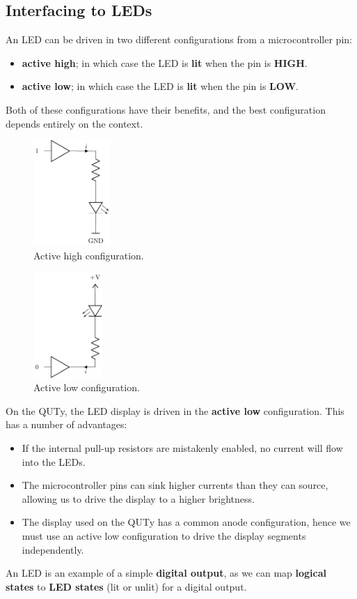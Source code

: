 \documentclass[a4paper]{report}
\begin{document}
\subsection{Interfacing to LEDs}
An LED can be driven in two different configurations from a microcontroller pin:
\begin{itemize}
    \item \textbf{active high}; in which case the LED is \textbf{lit} when the pin is \textbf{HIGH}.
    \item \textbf{active low}; in which case the LED is \textbf{lit} when the pin is \textbf{LOW}.
\end{itemize}
Both of these configurations have their benefits, and the best configuration depends entirely on the context.
\begin{multicols}{2}
    \begin{figure}[H]
        \centering
        \includegraphics[height = 4cm, keepaspectratio = true]{figures/active_high_LED.pdf}
        \caption{Active high configuration.} %
    \end{figure}
    \begin{figure}[H]
        \centering
        \includegraphics[height = 4cm, keepaspectratio = true]{figures/active_low_LED.pdf}
        \caption{Active low configuration.} %
    \end{figure}
\end{multicols}
On the QUTy, the LED display is driven in the \textbf{active low} configuration.
This has a number of advantages:
\begin{itemize}
    \item If the internal pull-up resistors are mistakenly enabled, no current will
          flow into the LEDs.
    \item The microcontroller pins can sink higher currents than they can source,
          allowing us to drive the display to a higher brightness.
    \item The display used on the QUTy has a common anode configuration, hence we must use an
          active low configuration to drive the display segments independently.
\end{itemize}
An LED is an example of a simple \textbf{digital output}, as we can map \textbf{logical states}
to \textbf{LED states} (lit or unlit) for a digital output.
\end{document}
